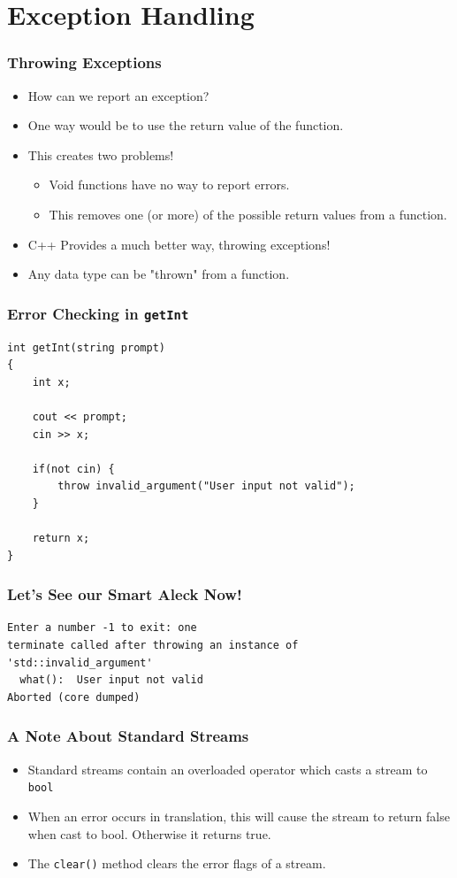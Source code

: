 \documentclass{beamer}
\begin{document}
\section{Exception Handling}
\begin{frame}
    \frametitle{Throwing Exceptions}
    \begin{itemize}[<+->]
        \item How can we report an exception?
        \item One way would be to use the return value of the function.
        \item This creates two problems!
        \begin{itemize}
            \item Void functions have no way to report errors.
            \item This removes one (or more) of the possible return values from a function.
        \end{itemize}
        \item C++ Provides a much better way, throwing exceptions!
        \item Any data type can be "thrown" from a function.
    \end{itemize}
\end{frame}

\begin{frame}[fragile]
    \frametitle{Error Checking in {\tt getInt}}
    {\small
    \begin{verbatim}
int getInt(string prompt)
{
    int x;
    
    cout << prompt;
    cin >> x;
    
    if(not cin) {
        throw invalid_argument("User input not valid");
    }
    
    return x;
}
\end{verbatim}
}
\end{frame}

\begin{frame}[fragile]
    \frametitle{Let's See our Smart Aleck Now!}
    \begin{verbatim}
Enter a number -1 to exit: one
terminate called after throwing an instance of 
'std::invalid_argument'
  what():  User input not valid
Aborted (core dumped)
    \end{verbatim}
\end{frame}

\begin{frame}
    \frametitle{A Note About Standard Streams}
    \begin{itemize}[<+->]
        \item Standard streams contain an overloaded operator which casts a stream to {\tt bool}
        \item When an error occurs in translation, this will cause the stream to return false when cast to bool.  Otherwise it returns true.
        \item The {\tt clear()} method clears the error flags of a stream.
    \end{itemize}
\end{frame}
\end{document}
